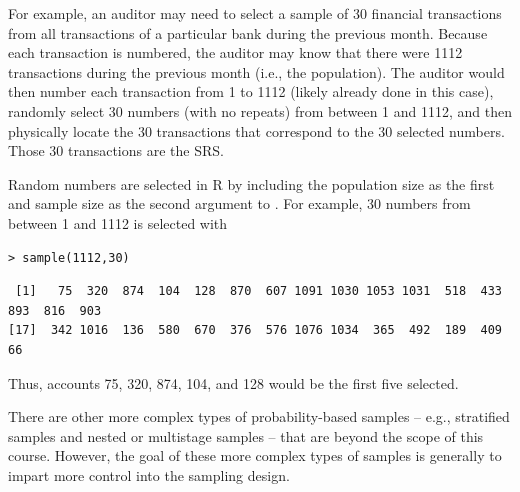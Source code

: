 \documentclass[10pt,openany]{book}\usepackage[]{graphicx}\usepackage[]{color}
\makeatletter
\newenvironment{kframe}{%
 \def\at@end@of@kframe{}%
 \ifinner\ifhmode%
  \def\at@end@of@kframe{\end{minipage}}%
  \begin{minipage}{\columnwidth}%
 \fi\fi%
 \def\FrameCommand##1{\hskip\@totalleftmargin \hskip-\fboxsep
 \colorbox{shadecolor}{##1}\hskip-\fboxsep
     \hskip-\linewidth \hskip-\@totalleftmargin \hskip\columnwidth}%
 \MakeFramed {\advance\hsize-\width
   \@totalleftmargin\z@ \linewidth\hsize
   \@setminipage}}%
 {\par\unskip\endMakeFramed%
 \at@end@of@kframe}
\newenvironment{knitrout}{}{} %
\makeatother
\begin{document}
For example, an auditor may need to select a sample of 30 financial transactions from all transactions of a particular bank during the previous month.  Because each transaction is numbered, the auditor may know that there were 1112 transactions during the previous month (i.e., the population).  The auditor would then number each transaction from 1 to 1112 (likely already done in this case), randomly select 30 numbers (with no repeats) from between 1 and 1112, and then physically locate the 30 transactions that correspond to the 30 selected numbers.  Those 30 transactions are the SRS.

Random numbers are selected in R by including the population size as the first and sample size as the second argument to .  For example, 30 numbers from between 1 and 1112 is selected with

\begin{knitrout}
\color{fgcolor}\begin{kframe}
\begin{verbatim}
> sample(1112,30)
\end{verbatim}
\end{kframe}
\end{knitrout}
\vspace{-12pt}
\begin{knitrout}
\color{fgcolor}\begin{kframe}
\begin{verbatim}
 [1]   75  320  874  104  128  870  607 1091 1030 1053 1031  518  433  893  816  903
[17]  342 1016  136  580  670  376  576 1076 1034  365  492  189  409   66
\end{verbatim}
\end{kframe}
\end{knitrout}

Thus, accounts 75, 320, 874, 104, and 128 would be the first five selected.

There are other more complex types of probability-based samples -- e.g., stratified samples and nested or multistage samples -- that are beyond the scope of this course.  However, the goal of these more complex types of samples is generally to impart more control into the sampling design.


\vspace{-12pt}
\end{document}
